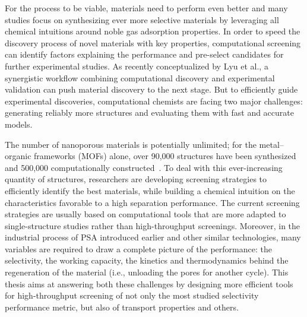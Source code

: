 For the process to be viable, materials need to perform even better and many studies focus on synthesizing ever more selective materials by leveraging all chemical intuitions around noble gas adsorption properties.\autocite{Chen_2014, Li_2019, Pei_2022} In order to speed the discovery process of novel materials with key properties, computational screening can identify factors explaining the performance and pre-select candidates for further experimental studies. As recently conceptualized by Lyu et al., a synergistic workflow combining computational discovery and experimental validation can push material discovery to the next stage.\autocite{Lyu_2020, Jablonka_2022} But to efficiently guide experimental discoveries, computational chemists are facing two major challenges: generating reliably more structures and evaluating them with fast and accurate models.

The number of nanoporous materials is potentially unlimited; for the metal--organic frameworks (MOFs) alone, over 90,000 structures have been synthesized~\autocite{Groom_2016} and 500,000 computationally constructed~\autocite{Wilmer_2012,Boyd_2016,Colon_2017}. To deal with this ever-increasing quantity of structures, researchers are developing screening strategies to efficiently identify the best materials, while building a chemical intuition on the characteristics favorable to a high separation performance. The current screening strategies are usually based on computational tools that are more adapted to single-structure studies rather than high-throughput screenings. Moreover, in the industrial process of PSA introduced earlier and other similar technologies, many variables are required to draw a complete picture of the performance: the selectivity, the working capacity, the kinetics and thermodynamics behind the regeneration of the material (i.e., unloading the pores for another cycle).\autocite{Kumar_1994} This thesis aims at answering both these challenges by designing more efficient tools for high-throughput screening of not only the most studied selectivity performance metric, but also of transport properties and others. 


\begin{center}
\end{center}

